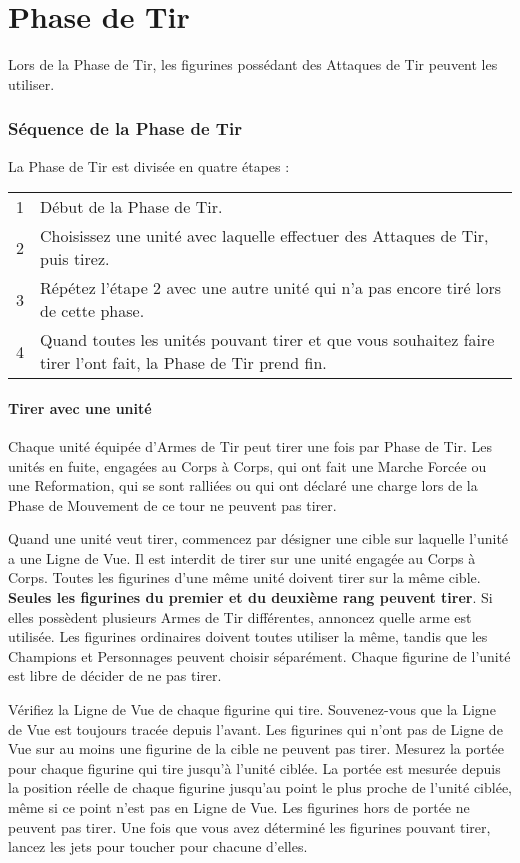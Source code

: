
\hypertarget{shootingphase}{\part{Phase de Tir}}

Lors de la Phase de Tir, les figurines possédant des Attaques de Tir peuvent les utiliser.

\section{Séquence de la Phase de Tir}

La Phase de Tir est divisée en quatre étapes :

\hspace*{0.3cm}
\begin{tabular}{c|m{14cm}}
1 & Début de la Phase de Tir. \tabularnewline
2 & Choisissez une unité avec laquelle effectuer des Attaques de Tir, puis tirez. \tabularnewline
3 & Répétez l'étape 2 avec une autre unité qui n'a pas encore tiré lors de cette phase. \tabularnewline
4 & Quand toutes les unités pouvant tirer et que vous souhaitez faire tirer l'ont fait, la Phase de Tir prend fin. \tabularnewline
\end{tabular}

\subsection{Tirer avec une unité}

Chaque unité équipée d'Armes de Tir peut tirer une fois par Phase de Tir. Les unités en fuite, engagées au Corps à Corps, qui ont fait une Marche Forcée ou une Reformation, qui se sont ralliées ou qui ont déclaré une charge lors de la Phase de Mouvement de ce tour ne peuvent pas tirer.

Quand une unité veut tirer, commencez par désigner une cible sur laquelle l'unité a une Ligne de Vue. Il est interdit de tirer sur une unité engagée au Corps à Corps. Toutes les figurines d'une même unité doivent tirer sur la même cible. \textbf{Seules les figurines du premier et du deuxième rang peuvent tirer}. Si elles possèdent plusieurs Armes de Tir différentes, annoncez quelle arme est utilisée. Les figurines ordinaires doivent toutes utiliser la même, tandis que les Champions et Personnages peuvent choisir séparément. Chaque figurine de l'unité est libre de décider de ne pas tirer.

Vérifiez la Ligne de Vue de chaque figurine qui tire. Souvenez-vous que la Ligne de Vue est toujours tracée depuis l'avant. Les figurines qui n'ont pas de Ligne de Vue sur au moins une figurine de la cible ne peuvent pas tirer. Mesurez la portée pour chaque figurine qui tire jusqu'à l'unité ciblée. La portée est mesurée depuis la position réelle de chaque figurine jusqu'au point le plus proche de l'unité ciblée, même si ce point n'est pas en Ligne de Vue. Les figurines hors de portée ne peuvent pas tirer. Une fois que vous avez déterminé les figurines pouvant tirer, lancez les jets pour toucher pour chacune d'elles.


